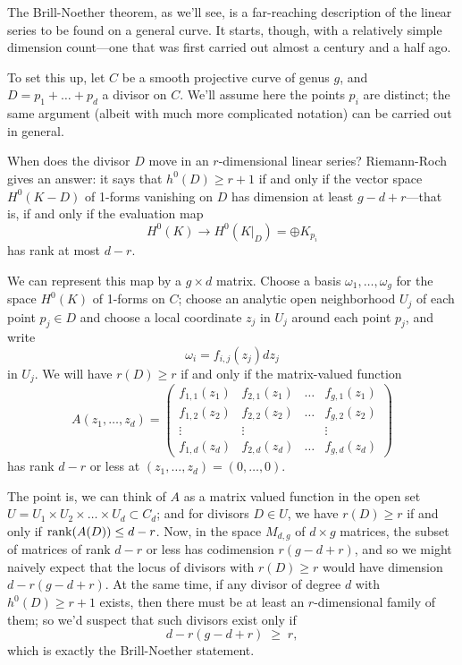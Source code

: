 The Brill-Noether theorem, as we'll see, is a far-reaching description of the linear series to be found on a general curve. It starts, though, with a relatively simple dimension count---one that was first carried out almost a century and a half ago.

To set this up, let $C$ be a smooth projective curve of genus $g$, and $D = p_1 + \dots + p_d$ a divisor on $C$. We'll assume here the points $p_i$ are distinct; the same argument (albeit with much more complicated notation) can be carried out in general.

When does the divisor $D$ move in an $r$-dimensional linear series? Riemann-Roch gives an answer: it says that $h^0(D) \geq r+1$ if and only if the vector space $H^0(K-D)$ of 1-forms vanishing on $D$ has dimension at least $g-d+r$---that is, if and only if the  evaluation map
$$
H^0(K) \to H^0(K|_D) = \oplus K_{p_i}
$$
has rank at most $d-r$. 

We can represent this map by a $g \times d$ matrix. Choose a basis $\omega_1,\dots,\omega_g$ for the space $H^0(K)$ of 1-forms on $C$; choose an analytic open neighborhood $U_j$ of each point $p_j \in D$ and choose a local coordinate $z_j$ in $U_j$ around each point $p_j$, and write
$$
\omega_i = f_{i,j}(z_j)dz_j
$$
in $U_j$. We will have $r(D) \geq r$ if and only if the  matrix-valued function
$$
A(z_1,\dots,z_d) = 
\begin{pmatrix}
f_{1,1}(z_1) & f_{2,1}(z_1) & \dots & f_{g,1}(z_1) \\
f_{1,2}(z_2) & f_{2,2}(z_2) & \dots & f_{g,2}(z_2) \\
\vdots & \vdots &  & \vdots \\
f_{1,d}(z_d) & f_{2,d}(z_d) & \dots & f_{g,d} (z_d)
\end{pmatrix}
$$
has rank $d-r$ or less at $(z_1,\dots,z_d) = (0,\dots,0)$.

The point is, we can think of $A$ as a matrix valued function in the open set $U = U_1 \times U_2 \times \dots \times U_d \subset C_d$; and for divisors $D \in U$, we have $r(D) \geq r$ if and only if $\operatorname{rank}(A(D)) \leq d-r$. Now, in the space $M_{d,g}$ of $d \times g$ matrices, the subset of matrices of rank $d-r$ or less has codimension $r(g-d+r)$, and so we might naively expect that the locus of divisors with $r(D) \geq r$ would have dimension $d - r(g-d+r)$. At the same time, if any divisor of degree $d$ with $h^0(D) \geq r+1$ exists, then there must be at least an $r$-dimensional family of them; so we'd suspect that such divisors exist only if
$$
d - r(g-d+r) \; \geq \; r,
$$
which is exactly the Brill-Noether statement.

